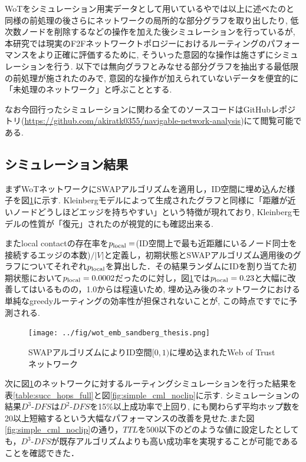 \documentclass[technicalreport]{./ieicej-v3.0/UTF/ieicej}
\begin{document}
 WoTをシミュレーション用実データとして用いている\cite{sandberg2006distributed}や\cite{clarke2010private}では以上に述べたのと同様の前処理の後さらにネットワークの局所的な部分グラフを取り出したり, 低次数ノードを削除するなどの操作を加えた後シミュレーションを行っているが, 本研究では現実のF2Fネットワークトポロジーにおけるルーティングのパフォーマンスをより正確に評価するために, そういった意図的な操作は施さずにシミュレーションを行う. 以下では無向グラフとみなせる部分グラフを抽出する最低限の前処理が施されたのみで, 意図的な操作が加えられていないデータを便宜的に「未処理のネットワーク」と呼ぶこととする.

なお今回行ったシミュレーションに関わる全てのソースコードはGitHubレポジトリ(\url{https://github.com/akiratk0355/navigable-network-analysis})にて閲覧可能である.

  \subsection{シミュレーション結果}
   まずWoTネットワークにSWAPアルゴリズムを適用し，ID空間に埋め込んだ様子を図\ref{fig:wot_emb}に示す. Kleinbergモデルによって生成されたグラフと同様に「距離が近いノードどうしほどエッジを持ちやすい」という特徴が現れており, Kleinbergモデルの性質が「復元」されたのが視覚的にも確認出来る.

   またlocal contactの存在率を$p_{\rm{local}}=$(ID空間上で最も近距離にいるノード同士を接続するエッジの本数)$/|V|$と定義し，初期状態とSWAPアルゴリズム適用後のグラフについてそれぞれ$p_{\rm{local}}$を算出した．その結果ランダムにIDを割り当てた初期状態において$p_{\rm{local}}=0.0002$だったのに対し，図\ref{fig:wot_emb}では$p_{\rm{local}} = 0.23$と大幅に改善してはいるものの，1.0からは程遠いため, 埋め込み後のネットワークにおける単純なgreedyルーティングの効率性が担保されないことが, この時点ですでに予測される.

   \begin{figure}[htb]
    \texttt{[image: ../fig/wot\_emb\_sandberg\_thesis.png]}
    \caption{SWAPアルゴリズムによりID空間$[0,1)$に埋め込まれたWeb of Trustネットワーク}
    \label{fig:wot_emb}
   \end{figure}

   次に図\ref{fig:wot_emb}のネットワークに対するルーティングシミュレーションを行った結果を表\ref{table:succ_hops_full}と図\ref{fig:simple_cml_noclip}に示す.  シミュレーションの結果$D^3$-$DFS$は$D^2$-$DFS$を15\%以上成功率で上回り, にも関わらず平均ホップ数を20以上短縮するという大幅なパフォーマンスの改善を見せた.また図\ref{fig:simple_cml_noclip}の通り，$TTL$を500以下のどのような値に設定したとしても，$D^3$-$DFS$が既存アルゴリズムよりも高い成功率を実現することが可能であることを確認できた．
\end{document}
